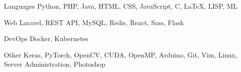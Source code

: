 

\begin{cvskills}

  \cvskill
    {Languages} %
    {Python, PHP, Java, HTML, CSS, JavaScript, C, \LaTeX, LISP, ML} %

  \cvskill
    {Web} %
    {Laravel, REST API, MySQL, Redis, React, Sass, Flask} %

  \cvskill
    {DevOps} %
    {Docker, Kubernetes} %

  \cvskill
    {Other} %
    {Keras, PyTorch, OpenCV, CUDA, OpenMP, Arduino, Git, Vim, Linux, Server Administration, Photoshop} %

\end{cvskills}
